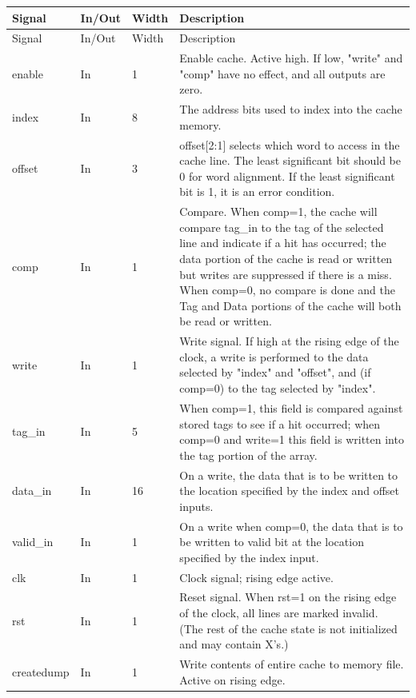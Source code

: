 \documentclass[11pt]{article}
\renewcommand{\arraystretch}{1.18} %
\begin{document}
\begin{center}
\renewcommand{\arraystretch}{1.1}
\setlength{\tabcolsep}{6pt}
\begin{longtable}{|>{\ttfamily}p{1.0in}|p{0.6in}|p{0.5in}|p{3.4in}|}
\hline
Signal & In/Out & Width & Description \\
\hline
\hline
\endfirsthead
\hline
Signal & In/Out & Width & Description \\
\hline
\hline
\endhead
\hline
\endfoot
enable & In & 1 & Enable cache. Active high. If low, "write" and "comp" have no effect, and all outputs are zero. \\
\hline
index & In & 8 & The address bits used to index into the cache memory. \\
\hline
offset & In & 3 & offset[2:1] selects which word to access in the cache line. The least significant bit should be 0 for word alignment. If the least significant bit is 1, it is an error condition. \\
\hline
comp & In & 1 & Compare. When comp=1, the cache will compare tag\_in to the tag of the selected line and indicate if a hit has occurred; the data portion of the cache is read or written but writes are suppressed if there is a miss. When comp=0, no compare is done and the Tag and Data portions of the cache will both be read or written. \\
\hline
write & In & 1 & Write signal. If high at the rising edge of the clock, a write is performed to the data selected by "index" and "offset", and (if comp=0) to the tag selected by "index". \\
\hline
tag\_in & In & 5 & When comp=1, this field is compared against stored tags to see if a hit occurred; when comp=0 and write=1 this field is written into the tag portion of the array. \\
\hline
data\_in & In & 16 & On a write, the data that is to be written to the location specified by the index and offset inputs. \\
\hline
valid\_in & In & 1 & On a write when comp=0, the data that is to be written to valid bit at the location specified by the index input. \\
\hline
clk & In & 1 & Clock signal; rising edge active. \\
\hline
rst & In & 1 & Reset signal. When rst=1 on the rising edge of the clock, all lines are marked invalid. (The rest of the cache state is not initialized and may contain X’s.) \\
\hline
createdump & In & 1 & Write contents of entire cache to memory file. Active on rising edge. \\

\end{longtable}
\end{center}
\end{document}
